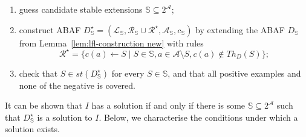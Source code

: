 \documentclass[letterpaper]{article} %
\newcommand{\stb}{\textit{st}}
\newcommand{\asms}{\asm}
\newcommand{\theory}{\mathit{Th}}
\newcommand{\lit}{\ensuremath{\mathcal{L}}}
\newcommand{\rules}{\ensuremath{\mathcal{R}}}
\newcommand{\asm}{\ensuremath{\mathcal{A}}}
\newcommand{\atoms}{\mathcal{L}}
\newcommand{\ruleset}{\mathcal{R}}
\newcommand{\assumptions}{\mathcal{A}}
\newcommand{\contra}{c}
\newcommand{\contrary}[1]{c(#1)}
\newcommand{\contraryempty}{c}
\newcommand{\ABAdef}{D=(\atoms,\ruleset,\assumptions,\contra)}
\newcommand{\setS}{\mathbb{S}}
\newcommand{\contraryAF}[1]{F^{c}_{#1}}
\newcommand{\contraryArgs}[1]{\asm^{c}_{#1}}
\newcommand{\Xpos}{\mathcal{X}^{pos}}
\newcommand{\Xneg}{\mathcal{X}^{neg}}
\begin{document}
\begin{enumerate}
    \item guess candidate stable extensions $\setS\subseteq 2^\asms$;
    \item construct ABAF $D_\setS^\star=(\mathcal{L}_\setS,\mathcal{R}_\setS\cup \rules^\star,\mathcal{A}_\setS,\contraryempty_\setS)$ by extending the ABAF $D_\setS$ from Lemma~\ref{lem:lfl-construction new} with rules $$\rules^\star= \{ \contrary{a} \gets S \mid S \in \setS, a\in \mathcal{A} \setminus S,\contrary{a}\notin \theory_D(S) \};$$
\item check that $S\in \stb(D_\setS^\star)$ for every $S\in \setS$, and that all positive examples and none of the negative is covered.
\end{enumerate}
It can be shown that $I$ has a solution if and only if there is some $\setS\subseteq 2^\asms$ such that $D^\star_\setS$ is a solution to $I$. 
Below, we characterise the conditions under which a solution exists. 
\end{document}
